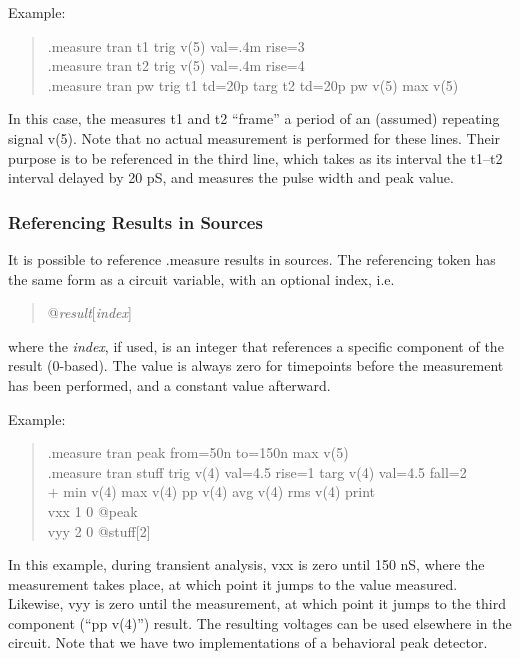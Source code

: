 Example:
\begin{quote}\vt
    .measure tran t1 trig v(5) val=.4m rise=3\\
    .measure tran t2 trig v(5) val=.4m rise=4\\
    .measure tran pw trig t1 td=20p targ t2 td=20p pw v(5) max v(5)\\
\end{quote}

In this case, the measures {\vt t1} and {\vt t2} ``frame'' a period
of an (assumed) repeating signal v(5).  Note that no actual
measurement is performed for these lines.  Their purpose is to be
referenced in the third line, which takes as its interval the {\vt
t1}--{\vt t2} interval delayed by 20 pS, and measures the pulse
width and peak value.

\subsubsection{Referencing Results in Sources}

It is possible to reference {\vt .measure} results in sources.  The
referencing token has the same form as a circuit variable, with an
optional index, i.e.
\begin{quote}\vt
    @{\it result\/}[{\it index\/}]
\end{quote}
where the {\it index\/}, if used, is an integer that references a
specific component of the result (0-based).  The value is always zero
for timepoints before the measurement has been performed, and a
constant value afterward.

Example:
\begin{quote}\vt
    .measure tran peak from=50n to=150n max v(5)\\
    .measure tran stuff trig v(4) val=4.5 rise=1 targ v(4) val=4.5 fall=2\\
    + min v(4) max v(4) pp v(4) avg v(4) rms v(4) print\\
    vxx 1 0 @peak\\
    vyy 2 0 @stuff[2]\\
\end{quote}

In this example, during transient analysis, {\vt vxx} is zero until
150 nS, where the measurement takes place, at which point it jumps to
the value measured.  Likewise, {\vt vyy} is zero until the
measurement, at which point it jumps to the third component (``{\vt pp
v(4)}'') result.  The resulting voltages can be used elsewhere in the
circuit.  Note that we have two implementations of a behavioral peak
detector.


